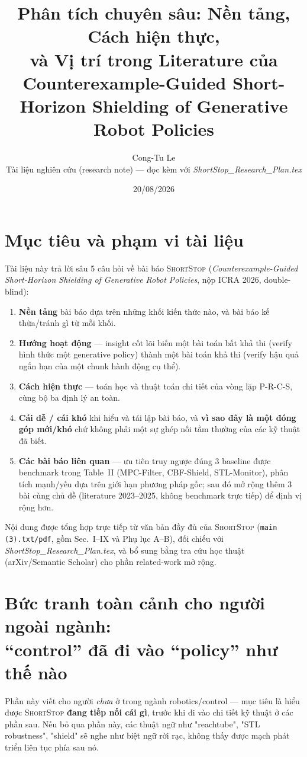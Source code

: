 \documentclass[a4paper,12pt]{article}
\title{\textbf{Phân tích chuyên sâu: Nền tảng, Cách hiện thực, \\ và Vị trí trong Literature của \st{}} \\[4pt]
\large Counterexample-Guided Short-Horizon Shielding of Generative Robot Policies}
\author{Cong-Tu Le \\ \small Tài liệu nghiên cứu (research note) --- đọc kèm với \emph{ShortStop\_Research\_Plan.tex}}
\date{20/08/2026}
\let\stdsection\section
\renewcommand{\section}{\clearpage\stdsection}
\newcommand{\st}{\textsc{ShortStop}}
\begin{document}
\maketitle
\tableofcontents

\section{Mục tiêu và phạm vi tài liệu}
Tài liệu này trả lời sâu 5 câu hỏi về bài báo \st{} (\emph{Counterexample-Guided Short-Horizon Shielding of Generative Robot Policies}, nộp ICRA 2026, double-blind):
\begin{enumerate}[label=(\arabic*)]
  \item \textbf{Nền tảng} bài báo dựa trên những khối kiến thức nào, và bài báo kế thừa/tránh gì từ mỗi khối.
  \item \textbf{Hướng hoạt động} --- insight cốt lõi biến một bài toán bất khả thi (verify hình thức một generative policy) thành một bài toán khả thi (verify hậu quả ngắn hạn của một chunk hành động cụ thể).
  \item \textbf{Cách hiện thực} --- toán học và thuật toán chi tiết của vòng lặp P-R-C-S, cùng bộ ba định lý an toàn.
  \item \textbf{Cái dễ / cái khó} khi hiểu và tái lập bài báo, và \textbf{vì sao đây là một đóng góp mới/khó} chứ không phải một sự ghép nối tầm thường của các kỹ thuật đã biết.
  \item \textbf{Các bài báo liên quan} --- ưu tiên truy ngược đúng 3 baseline được benchmark trong Table~II (MPC-Filter, CBF-Shield, STL-Monitor), phân tích mạnh/yếu dựa trên giới hạn phương pháp gốc; sau đó mở rộng thêm 3 bài cùng chủ đề (literature 2023--2025, không benchmark trực tiếp) để định vị rộng hơn.
\end{enumerate}
Nội dung được tổng hợp trực tiếp từ văn bản đầy đủ của \st{} (\texttt{main (3).txt/pdf}, gồm Sec.~I--IX và Phụ lục A--B), đối chiếu với \emph{ShortStop\_Research\_Plan.tex}, và bổ sung bằng tra cứu học thuật (arXiv/Semantic Scholar) cho phần related-work mở rộng.

\section{Bức tranh toàn cảnh cho người ngoài ngành: \\ ``control'' đã đi vào ``policy'' như thế nào}\label{sec:bigpicture}
Phần này viết cho người \emph{chưa} ở trong ngành robotics/control --- mục tiêu là hiểu được \st{} \textbf{đang tiếp nối cái gì}, trước khi đi vào chi tiết kỹ thuật ở các phần sau. Nếu bỏ qua phần này, các thuật ngữ như "reachtube", "STL robustness", "shield" sẽ nghe như biệt ngữ rời rạc, không thấy được mạch phát triển liên tục phía sau nó.
\end{document}

